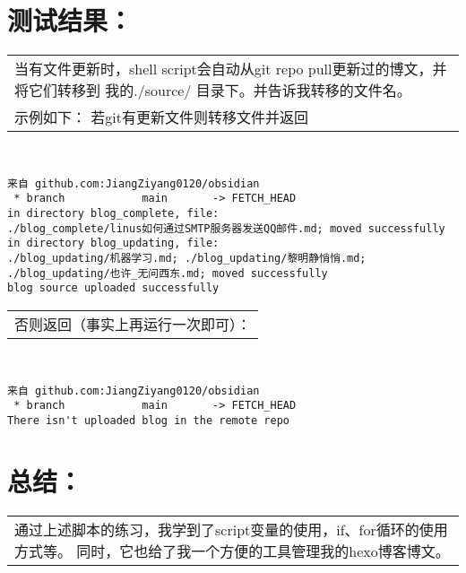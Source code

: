 \documentclass{ctexart}
\begin{document}
    \section{测试结果：}
    \begin{tabular}{p{\columnwidth}}
        当有文件更新时，shell script会自动从git repo pull更新过的博文，并将它们转移到
        我的./source/ 目录下。并告诉我转移的文件名。\\
        示例如下：
        若git有更新文件则转移文件并返回
    \end{tabular}\\
    \begin{lstlisting}
来自 github.com:JiangZiyang0120/obsidian
 * branch            main       -> FETCH_HEAD
in directory blog_complete, file:
./blog_complete/linus如何通过SMTP服务器发送QQ邮件.md; moved successfully
in directory blog_updating, file:
./blog_updating/机器学习.md; ./blog_updating/黎明静悄悄.md; ./blog_updating/也许_无问西东.md; moved successfully
blog source uploaded successfully
    \end{lstlisting}
    \begin{tabular}{p{\columnwidth}}
        否则返回（事实上再运行一次即可）：
    \end{tabular}\\
    \begin{lstlisting}
来自 github.com:JiangZiyang0120/obsidian
 * branch            main       -> FETCH_HEAD
There isn't uploaded blog in the remote repo
    \end{lstlisting}

    \section{总结：}
    \begin{tabular}{p{\columnwidth}}
        通过上述脚本的练习，我学到了script变量的使用，if、for循环的使用方式等。
        同时，它也给了我一个方便的工具管理我的hexo博客博文。\\
    \end{tabular}
\end{document}
